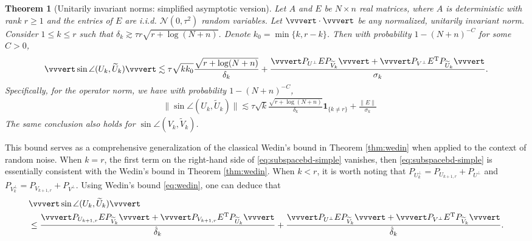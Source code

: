 \documentclass[reqno]{amsart}
\newcommand{\T}{\mathrm{T}}
\theoremstyle{plain}
\newtheorem{theorem}{Theorem}
\theoremstyle{definition}
\begin{document}
\begin{theorem}[Unitarily invariant norms: simplified asymptotic version] \label{thm:subspace-simple}
Let $A$ and $E$ be $N \times n$ real matrices, where $A$ is deterministic with rank $r \geq 1$ and the entries of $E$ are i.i.d.  $\mathcal{N}(0,\tau^2)$ random variables. Let $\vvvert \cdot \vvvert$ be any normalized, unitarily invariant norm.  Consider $1\le k \le r$ such that $\delta_{k}\gtrsim  \tau r\sqrt{r+\log(N+n)}$. Denote $k_0=\min\{k, r-k\}$. Then with probability $1 - (N+n)^{-C}$ for some $C>0$,
\begin{align}\label{eq:subspacebd-simple}
\vvvert \sin \angle ( U_{k}, \widetilde{ U}_{k}) \vvvert \lesssim  \tau  \sqrt{k k_0} \frac{\sqrt{r+\log(N+n)}}{\delta_{k}} +  \frac{\vvvert P_{U^\perp} E P_{\widetilde V_{k}}\vvvert + \vvvert P_{V^\perp} E^\T P_{\widetilde U_{k}} \vvvert }{{\sigma}_{k}}.
\end{align}
Specifically, for the operator norm, we have with probability $1 - (N+n)^{-C}$,
\begin{align}\label{eq:subspace-op}
&\| \sin \angle ( U_{k}, \widetilde{ U}_{k}) \| \lesssim  \tau \sqrt{k}\frac{\sqrt{r+\log(N+n)}}{\delta_{k}} \mathbf{1}_{\{k\neq r \}} + \frac{\|E\|}{{\sigma}_{k}}
\end{align}  
The same conclusion also holds for $\sin \angle (V_{k}, \widetilde{V}_{k})$. 
\end{theorem}
This bound serves as a comprehensive generalization of the classical Wedin's bound in Theorem \ref{thm:wedin} when applied to the context of random noise. When $k=r$, the first term on the right-hand side of \eqref{eq:subspacebd-simple} vanishes, then \eqref{eq:subspacebd-simple} is essentially consistent with the Wedin's bound in Theorem \ref{thm:wedin}. When $k<r$, it is worth noting that  $P_{U_{k}^\perp} = P_{U_{k+1,r}} + P_{U^\perp}$ and $P_{V_{k}^\perp} = P_{V_{k+1,r}} + P_{V^\perp}$. Using Wedin's bound \eqref{eq:wedin}, one can deduce that
\begin{align}\label{eq:comparew}
&\vvvert \sin \angle ( U_{k}, \widetilde{ U}_{k}) \vvvert \nonumber\\
& \le \frac{\vvvert P_{U_{k+1,r}}E P_{\widetilde V_{k}}\vvvert + \vvvert P_{V_{k+1,r}}E^\T P_{\widetilde U_{k}}\vvvert}{\hat \delta_{k}}+\frac{\vvvert P_{U^\perp}E P_{\widetilde V_{k}}\vvvert+\vvvert P_{V^\perp}E^\T P_{\widetilde V_{k}}\vvvert}{\hat \delta_{k}}.
\end{align}
\end{document}
